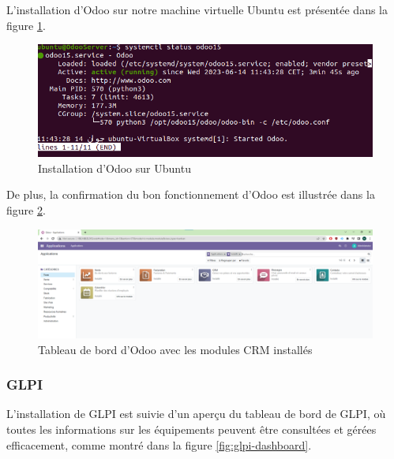 L'installation d'Odoo \cite{odoo16-ubuntu-install} sur notre machine virtuelle Ubuntu est présentée dans la figure \ref{fig:odoo-installation}.

\begin{figure}[H]
\centering
\includegraphics[width=15cm]{Images/OdooServer1.png}
\caption{Installation d'Odoo sur Ubuntu}
\label{fig:odoo-installation}
\end{figure}

De plus, la confirmation du bon fonctionnement d'Odoo est illustrée dans la figure \ref{fig:odoo-dashboard}. 

\begin{figure}[H]
\centering
\includegraphics[width=15cm]{Images/OdooServer2.png}
\caption{Tableau de bord d'Odoo avec les modules CRM installés}
\label{fig:odoo-dashboard}
\end{figure}



\subsubsection{GLPI}

L'installation de GLPI \cite{glpi-install-tecmint} est suivie d'un aperçu du tableau de bord de GLPI, où toutes les informations sur les équipements peuvent être consultées et gérées efficacement, comme montré dans la figure \ref{fig:glpi-dashboard}.

